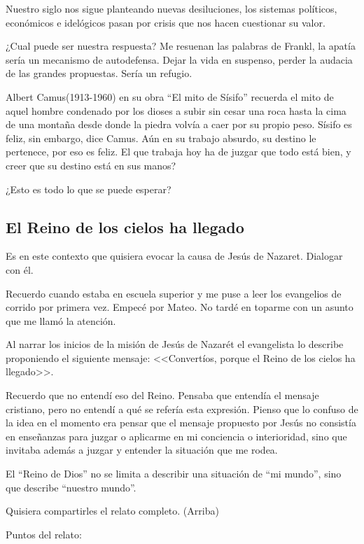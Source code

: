 \documentclass[10pt]{article}
\begin{document}
Nuestro siglo nos sigue planteando nuevas desiluciones, los sistemas políticos,
económicos e idelógicos pasan por crisis que nos hacen cuestionar su valor.

¿Cual puede ser nuestra respuesta? Me resuenan las palabras de Frankl, la apatía
sería un mecanismo de autodefensa. Dejar la vida en suspenso, perder la audacia
de las grandes propuestas. Sería un refugio.

Albert Camus(1913-1960) en su obra ``El mito de Sísifo'' recuerda el mito de
aquel hombre condenado por los dioses a subir sin cesar una roca hasta la cima
de una montaña desde donde la piedra volvía a caer por su propio peso. Sísifo es
feliz, sin embargo, dice Camus. Aún en su trabajo absurdo, su destino le
pertenece, por eso es feliz. El que trabaja hoy ha de juzgar que todo está bien,
y creer que su destino está en sus manos?

¿Esto es todo lo que se puede esperar?

\subsection{El Reino de los cielos ha llegado}

    Es en este contexto que quisiera evocar la causa de Jesús de Nazaret. Dialogar
    con él.

    Recuerdo cuando estaba en escuela superior y me puse a leer los evangelios de
    corrido por primera vez. Empecé por Mateo. No tardé en toparme con un asunto
    que me llamó la atención.

    Al narrar los inicios de la misión de Jesús de Nazarét el evangelista lo
    describe proponiendo el siguiente mensaje: <<Convertíos, porque el Reino de
    los cielos ha llegado>>.

    Recuerdo que no entendí eso del Reino. Pensaba que entendía el mensaje
    cristiano, pero no entendí a qué se refería esta expresión. Pienso que lo
    confuso de la idea en el momento era pensar que el mensaje propuesto por Jesús
    no consistía en enseñanzas para juzgar o aplicarme en mi conciencia o
    interioridad, sino que invitaba además a juzgar y entender la situación que me
    rodea.

    El ``Reino de Dios'' no se limita a describir una situación de ``mi mundo'',
    sino que describe ``nuestro mundo''.

    Quisiera compartirles el relato completo. (Arriba)

    Puntos del relato: 
\end{document}
